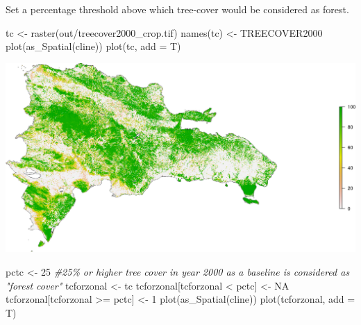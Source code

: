 \documentclass[10pt,landscape,a3paper]{article}
\newenvironment{Shaded}{\begin{snugshade}}{\end{snugshade}}
\newcommand{\AttributeTok}[1]{\textcolor[rgb]{0.77,0.63,0.00}{#1}}
\newcommand{\CommentTok}[1]{\textcolor[rgb]{0.56,0.35,0.01}{\textit{#1}}}
\newcommand{\ConstantTok}[1]{\textcolor[rgb]{0.00,0.00,0.00}{#1}}
\newcommand{\DecValTok}[1]{\textcolor[rgb]{0.00,0.00,0.81}{#1}}
\newcommand{\FunctionTok}[1]{\textcolor[rgb]{0.00,0.00,0.00}{#1}}
\newcommand{\NormalTok}[1]{#1}
\newcommand{\OtherTok}[1]{\textcolor[rgb]{0.56,0.35,0.01}{#1}}
\newcommand{\SpecialCharTok}[1]{\textcolor[rgb]{0.00,0.00,0.00}{#1}}
\newcommand{\StringTok}[1]{\textcolor[rgb]{0.31,0.60,0.02}{#1}}
\begin{document}
Set a percentage threshold above which tree-cover would be considered as
forest.

\begin{Shaded}
\begin{Highlighting}[]
\NormalTok{tc }\OtherTok{\textless{}{-}} \FunctionTok{raster}\NormalTok{(}\StringTok{\textquotesingle{}out/treecover2000\_crop.tif\textquotesingle{}}\NormalTok{)}
\FunctionTok{names}\NormalTok{(tc) }\OtherTok{\textless{}{-}} \StringTok{\textquotesingle{}TREECOVER2000\textquotesingle{}}
\FunctionTok{plot}\NormalTok{(}\FunctionTok{as\_Spatial}\NormalTok{(cline))}
\FunctionTok{plot}\NormalTok{(tc, }\AttributeTok{add =}\NormalTok{ T)}
\end{Highlighting}
\end{Shaded}

\begin{center}\includegraphics{img/data-download-preparation-eda/tree-canopy-cover-2000-nationwide-1} \end{center}

\begin{Shaded}
\begin{Highlighting}[]
\NormalTok{pctc }\OtherTok{\textless{}{-}} \DecValTok{25} \CommentTok{\#25\% or higher tree cover in year 2000 as a baseline is considered as "forest cover"}
\NormalTok{tcforzonal }\OtherTok{\textless{}{-}}\NormalTok{ tc}
\NormalTok{tcforzonal[tcforzonal }\SpecialCharTok{\textless{}}\NormalTok{ pctc] }\OtherTok{\textless{}{-}} \ConstantTok{NA}
\NormalTok{tcforzonal[tcforzonal }\SpecialCharTok{\textgreater{}=}\NormalTok{ pctc] }\OtherTok{\textless{}{-}} \DecValTok{1}
\FunctionTok{plot}\NormalTok{(}\FunctionTok{as\_Spatial}\NormalTok{(cline))}
\FunctionTok{plot}\NormalTok{(tcforzonal, }\AttributeTok{add =}\NormalTok{ T)}
\end{Highlighting}
\end{Shaded}
\end{document}
